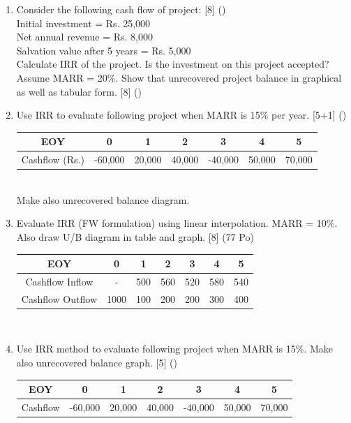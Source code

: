 \documentclass[12pt]{article}
\begin{document}
\begin{enumerate}[noitemsep, topsep = 0pt]
	\item Consider the following cash flow of project: \hfill [8] ()\\
	Initial investment = Rs. 25,000\\
	Net annual revenue = Rs. 8,000\\
	Salvation value after 5 years = Rs. 5,000\\
	Calculate IRR of the project. Is the investment on this project accepted?\\
	Assume MARR = 20\%. Show that unrecovered project balance in graphical as well as tabular form. \hfill [8] ()
	
	\item Use IRR to evaluate following project when MARR is 15\% per year. \hfill [5+1] ()\\
	\begin{tabular}{|c|c|c|c|c|c|c|}
		\hline
		EOY & 0 & 1 & 2 & 3 & 4 & 5\\ \hline
		Cashflow (Rs.) & -60,000 & 20,000 & 40,000 & -40,000 & 50,000 & 70,000\\ \hline
	\end{tabular}\\[0pt]
	Make also unrecovered balance diagram.
	
	\item Evaluate IRR (FW formulation) using linear interpolation. MARR = 10\%. Also draw U/B diagram in table and graph. \hfill [8] (77 Po)\\
	\begin{tabular}{|c|c|c|c|c|c|c|}
		\hline
		EOY & 0 & 1 & 2 & 3 & 4 & 5\\ \hline
		Cashflow Inflow & - & 500 & 560 & 520 & 580 & 540\\ \hline
		Cashflow Outflow & 1000 & 100 & 200 & 200 & 300 & 400\\ \hline
	\end{tabular}\\[0pt]
	
	\item Use IRR method to evaluate following project when MARR is 15\%. Make also unrecovered balance graph. \hfill [5] ()\\
	\begin{tabular}{|c|c|c|c|c|c|c|}
		\hline
		EOY & 0 & 1 & 2 & 3 & 4 & 5\\ \hline
		Cashflow & -60,000 & 20,000 & 40,000 & -40,000 & 50,000 & 70,000\\ \hline
	\end{tabular}\\[0pt]
	

\end{enumerate}
\end{document}
